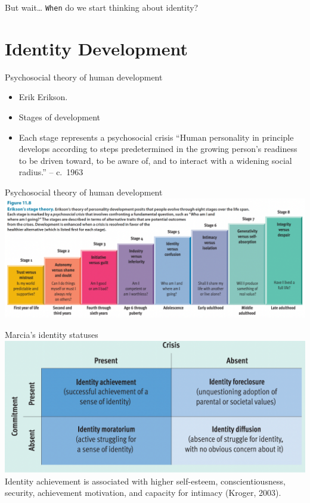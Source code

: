 \documentclass[
  ignorenonframetext,
  aspectratio=169,
]{beamer}
\providecommand{\tightlist}{%
  \setlength{\itemsep}{0pt}\setlength{\parskip}{0pt}}\usepackage{longtable,booktabs,array}
\begin{document}
\begin{frame}[fragile]{But wait\ldots{}}
\label{but-wait}
\texttt{When} do we start thinking about identity?
\end{frame}

\section{Identity Development}\label{identity-development}

\begin{frame}{Psychosocial theory of human development}
\label{psychosocial-theory-of-human-development}
\begin{itemize}[<+->]
\tightlist
\item
  Erik Erikson.
\item
  Stages of development
\item
  Each stage represents a psychosocial crisis ``Human personality in
  principle develops according to steps predetermined in the growing
  person's readiness to be driven toward, to be aware of, and to
  interact with a widening social radius.'' -- c.~1963
\end{itemize}
\end{frame}

\begin{frame}{Psychosocial theory of human development}
\label{psychosocial-theory-of-human-development-1}
\includegraphics{figs/stages.png}
\end{frame}

\begin{frame}{Marcia's identity statuses}
\label{marcias-identity-statuses}
\includegraphics{figs/marcia.png} Identity achievement is associated
with higher self-esteem, conscientiousness, security, achievement
motivation, and capacity for intimacy (Kroger, 2003).
\end{frame}
\end{document}
